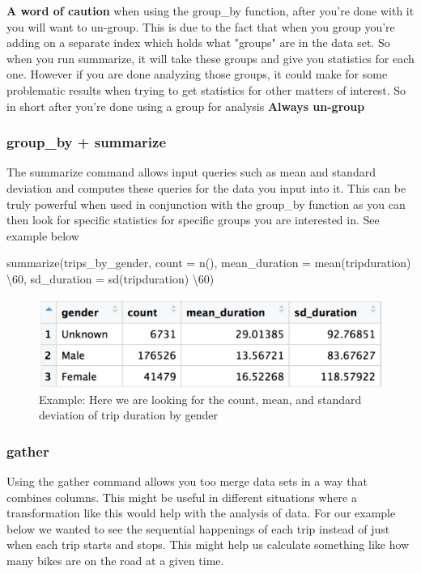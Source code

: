 \begin{flushleft}
\textbf{A word of caution} when using the group\_by function, after you're done with it you will want to un-group. This is due to the fact that when you group you're adding on a separate index which holds what "groups" are in the data set. So when you run summarize, it will take these groups and give you statistics for each one. However if you are done analyzing those groups, it could make for some problematic results when trying to get statistics for other matters of interest. So in short after you're done using a group for analysis \textbf{Always un-group}
\end{flushleft}

\subsubsection{group\_by + summarize}
\begin{flushleft}
The summarize command allows input queries such as mean and standard deviation and computes these queries for the data you input into it. This can be truly powerful when used in conjunction with the group\_by function as you can then look for specific statistics for specific groups you are interested in. 
See example below
\end{flushleft}

\begin{center}
summarize(trips\_by\_gender, count = n(), mean\_duration = mean(tripduration) \textbackslash 60, sd\_duration = sd(tripduration) \textbackslash 60)
\end{center}    

\begin{figure}[h]
    \centering
    \includegraphics[width=.75\textwidth]{figures/group_and_summarize.png}
    \caption{Example: Here we are looking for the count, mean, and standard deviation of trip duration by gender }
    \label{fig:group_and_summarize}
\end{figure}


\subsubsection{gather}
\begin{flushleft}
Using the gather command allows you too merge data sets in a way that combines columns. This might be useful in different situations where a transformation like this would help with the analysis of data. For our example below we wanted to see the sequential happenings of each trip instead of just when each trip starts and stops. This might help us calculate something like how many bikes are on the road at a given time. 
\end{flushleft}

